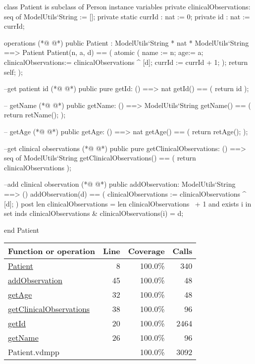 \begin{vdmpp}[breaklines=true]
class Patient is subclass of Person
instance variables
 private clinicalObservations: seq of ModelUtils`String := [];
 private static currId : nat := 0;
 private id : nat := currId;
 
operations
(*@
\label{Patient:8}
@*)
 public Patient : ModelUtils`String * nat * ModelUtils`String ==> Patient
 Patient(n, a, d) == (
  atomic (
   name := n;
   age:= a;
   clinicalObservations:= clinicalObservations ^ [d];
   currId := currId + 1;
  );
  return self;
 );
  
 --get patient id
(*@
\label{getId:20}
@*)
 public pure getId: () ==> nat
 getId() == (
  return id
 );
 
 -- getName
(*@
\label{getName:26}
@*)
  public getName: () ==> ModelUtils`String
  getName() == (
    return retName();  
  );

  -- getAge 
(*@
\label{getAge:32}
@*)
  public getAge: () ==> nat
  getAge() == (
    return retAge();  
  );
  
 --get clinical observations
(*@
\label{getClinicalObservations:38}
@*)
 public pure getClinicalObservations: () ==> seq of ModelUtils`String
 getClinicalObservations() == (
  return clinicalObservations
 );
 
 
 --add clinical observation
(*@
\label{addObservation:45}
@*)
 public addObservation: ModelUtils`String ==> ()
 addObservation(d) == (
  clinicalObservations := clinicalObservations ^ [d];
 )
 post len clinicalObservations = len clinicalObservations~ + 1 and
    exists i in set inds clinicalObservations & clinicalObservations(i) = d;
 
 
end Patient
\end{vdmpp}
\bigskip
\begin{longtable}{|l|r|r|r|}
\hline
Function or operation & Line & Coverage & Calls \\
\hline
\hline
\hyperref[Patient:8]{Patient} & 8&100.0\% & 340 \\
\hline
\hyperref[addObservation:45]{addObservation} & 45&100.0\% & 48 \\
\hline
\hyperref[getAge:32]{getAge} & 32&100.0\% & 48 \\
\hline
\hyperref[getClinicalObservations:38]{getClinicalObservations} & 38&100.0\% & 96 \\
\hline
\hyperref[getId:20]{getId} & 20&100.0\% & 2464 \\
\hline
\hyperref[getName:26]{getName} & 26&100.0\% & 96 \\
\hline
\hline
Patient.vdmpp & & 100.0\% & 3092 \\
\hline
\end{longtable}


